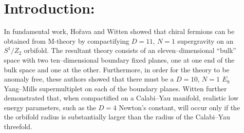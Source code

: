 \documentclass[a4paper,12pt]{article}
\numberwithin{equation}{section}
\theoremstyle{plain}
\begin{document}

\section{Introduction:}


In fundamental work, Ho\v rava and Witten \cite{HW1, HW2} 
showed that chiral fermions can be
obtained from M-theory by compactifying $D=11$, $N=1$ supergravity on an
$S^{1}/Z_{2}$ orbifold. The resultant theory consists of an
eleven--dimensional ``bulk'' space with two ten--dimensional boundary fixed
planes, one at one end of the bulk space and one at the other. Furthermore, in
order for the theory to be anomaly free, these authors showed that there must 
be a $D=10$, $N=1$ $E_{8}$ Yang--Mills supermultiplet on each of the boundary
planes. Witten \cite{W} further demonstrated that, 
when compactified on a
Calabi--Yau manifold, realistic low energy parameters,
such as the $D=4$ Newton's constant, will occur only if the the orbifold
radius is substantially larger than the radius of the Calabi--Yau threefold.
\end{document}
